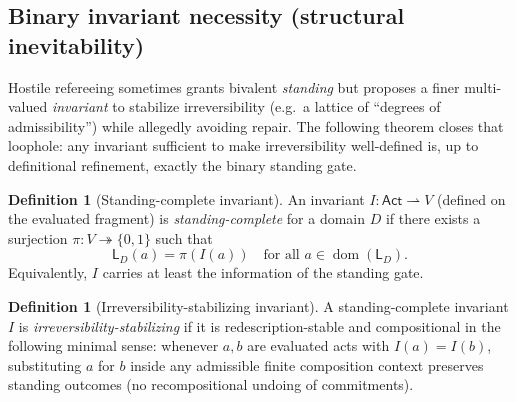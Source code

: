 \documentclass[11pt]{article}
\theoremstyle{definition}
\newtheorem{definition}[theorem]{Definition}
\newcommand{\Act}{\mathsf{Act}}
\newcommand{\Stand}{\mathsf{L}}
\newcommand{\pdom}{\operatorname{dom}}
\newcommand{\ppar}{\rightharpoonup} %
\begin{document}
\subsection{Binary invariant necessity (structural inevitability)}
\label{sec:binary-necessity}

Hostile refereeing sometimes grants bivalent \emph{standing} but proposes a finer multi-valued
\emph{invariant} to stabilize irreversibility (e.g.\ a lattice of ``degrees of admissibility'') while allegedly
avoiding repair.
The following theorem closes that loophole: any invariant sufficient to make irreversibility
well-defined is, up to definitional refinement, exactly the binary standing gate.

\begin{definition}[Standing-complete invariant]
An invariant $I:\Act\ppar V$ (defined on the evaluated fragment) is \emph{standing-complete}
for a domain $D$ if there exists a surjection $\pi:V\twoheadrightarrow\{0,1\}$ such that
\[
\Stand_D(a)=\pi(I(a))
\quad\text{for all }a\in\pdom(\Stand_D).
\]
Equivalently, $I$ carries at least the information of the standing gate.
\end{definition}

\begin{definition}[Irreversibility-stabilizing invariant]
A standing-complete invariant $I$ is \emph{irreversibility-stabilizing} if it is redescription-stable
and compositional in the following minimal sense:
whenever $a,b$ are evaluated acts with $I(a)=I(b)$, substituting $a$ for $b$ inside any admissible
finite composition context preserves standing outcomes (no recompositional undoing of commitments).
\end{definition}
\end{document}
